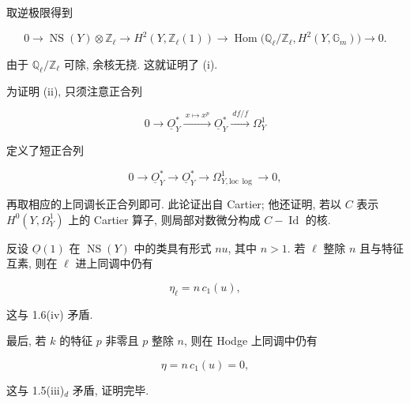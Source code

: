 取逆极限得到

\begin{equation*}
0\longrightarrow\operatorname{NS}(Y)\otimes\mathbb Z_\ell
\longrightarrow H^2(Y,\mathbb Z_\ell(1))
\longrightarrow
\operatorname{Hom}\bigl(\mathbb Q_\ell/\mathbb Z_\ell,
H^2(Y,\mathbb G_m)\bigr)
\longrightarrow0.
\end{equation*}

由于 $\mathbb Q_\ell/\mathbb Z_\ell$ 可除, 余核无挠. 这就证明了 (i).

为证明 (ii), 只须注意正合列

\begin{equation*}
0\longrightarrow\underline O_Y^*
\xrightarrow{\ x\mapsto x^p\ }\underline O_Y^*
\xrightarrow{\ df/f\ }\Omega_Y^1
\end{equation*}

定义了短正合列

\begin{equation*}
0\longrightarrow\underline O_Y^*\longrightarrow\underline O_Y^*
\longrightarrow\Omega^1_{Y,\mathrm{loc}\,\log}\longrightarrow0,
\end{equation*}

再取相应的上同调长正合列即可. 此论证出自 Cartier; 他还证明, 若以 $C$ 表示 $H^0(Y,\Omega_Y^1)$ 上的 Cartier 算子, 则局部对数微分构成 $C-\operatorname{Id}$ 的核.

反设 $\underline O(1)$ 在 $\operatorname{NS}(Y)$ 中的类具有形式 $nu$, 其中 $n>1$. 若 $\ell$ 整除 $n$ 且与特征互素, 则在 $\ell$ 进上同调中仍有


\begin{equation*}
\eta_\ell=n\,c_1(u),
\end{equation*}

这与 1.6(iv) 矛盾.

最后, 若 $k$ 的特征 $p$ 非零且 $p$ 整除 $n$, 则在 Hodge 上同调中仍有

\begin{equation*}
\eta=n\,c_1(u)=0,
\end{equation*}

这与 1.5(iii)$_d$ 矛盾, 证明完毕.

